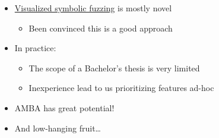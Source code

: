 \begin{frame}
	\begin{itemize}

        \item \underline{Visualized symbolic fuzzing} is mostly novel
            \begin{itemize}
                \item Been convinced this is a good approach
            \end{itemize}

        \item In practice:
            \begin{itemize}
                \item The scope of a Bachelor's thesis is very limited
                \item Inexperience lead to us prioritizing features ad-hoc
            \end{itemize}

		\item AMBA has great potential!
        \item And low-hanging fruit\dots

	\end{itemize}
	\vfill
\end{frame}
